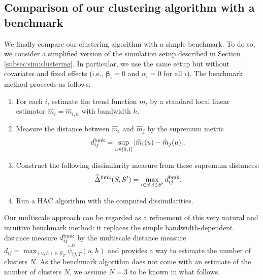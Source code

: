 \documentclass[12pt]{article}
\begin{document}
\subsection{Comparison of our clustering algorithm with a benchmark}


We finally compare our clustering algorithm with a simple benchmark. To do so, we consider a simplified version of the simulation setup described in Section \ref{subsec:sim:clustering}. In particular, we use the same setup but without covariates and fixed effects (i.e., $\boldsymbol{\beta}_i = 0$ and $\alpha_i = 0$ for all $i$). The benchmark method proceeds as follows: 
\begin{enumerate}[label=\textit{Step \arabic*}.,leftmargin=1.5cm,itemsep=0pt,parsep=0pt,topsep=3pt]
\item For each $i$, estimate the trend function $m_i$ by a standard local linear estimator $\widehat{m}_i = \widehat{m}_{i,h}$ with bandwidth $h$.
\item Measure the distance between $\widehat{m}_i$ and $\widehat{m}_j$ by the supremum metric 
\[ d_{ij}^{\textnormal{bmk}} = \sup_{u \in [0,1]} |\widehat{m}_i(u) - \widehat{m}_j(u)|. \]
\item Construct the following dissimilarity measure from these supremum distances:
\[ \widehat{\Delta}^{\textnormal{bmk}}(S,S') = \max_{i \in S,j \in S'} d_{ij}^{\textnormal{bmk}}. \]
\item Run a HAC algorithm with the computed dissimilarities. 
\end{enumerate}
Our multiscale approach can be regarded as a refinement of this very natural and intuitive benchmark method: it replaces the simple bandwidth-dependent distance measure $d_{ij}^{\textnormal{bmk}}$ by the multiscale distance measure $d_{ij} = \max_{(u, h) \in \mathcal{G}_T}\widehat{\psi}^0_{ij, T}(u, h)$ and provides a way to estimate the number of clusters $N$. As the benchmark algorithm does not come with an estimate of the number of clusters $N$, we assume $N=3$ to be known in what follows. 

\end{document}
